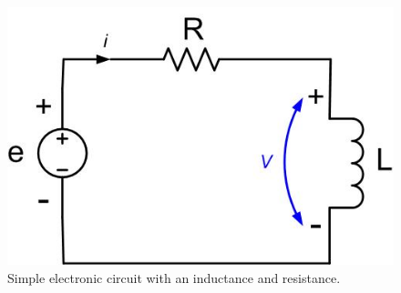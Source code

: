 \documentclass{ximera}
\begin{document}
\begin{figure}[htbp]
\begin{center}
\includegraphics[scale=0.5]{../jpg/CircuitwithInductor.jpg}
\end{center}
\caption{Simple electronic circuit with an inductance and resistance. }
\label{MutualInduc}
\end{figure}
\end{document}
